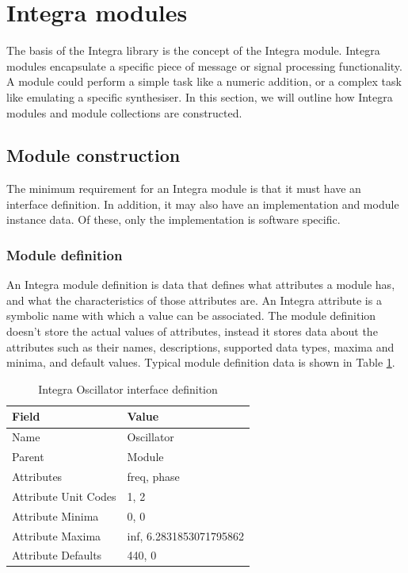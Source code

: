 \section{Integra modules}\label{sec:modules}

The basis of the Integra library is the concept of the Integra module.
Integra modules encapsulate a specific piece of message or signal
processing functionality. A module could perform a simple task like a
numeric addition, or a complex task like emulating a specific
synthesiser. In this section, we will outline how Integra modules and
module collections are constructed.

\subsection{Module construction}\label{subsec:module_construction}

The minimum requirement for an Integra module is that it must have an
interface definition. In addition, it may also have an implementation
and module instance data. Of these, only the implementation is
software specific.

\subsubsection{Module definition}\label{subsubsec:module_definition}

An Integra module definition is data that defines what attributes a
module has, and what the characteristics of those attributes are. An
Integra attribute is a symbolic name with which a value can be
associated. The module definition doesn't store the actual values of
attributes, instead it stores data about the attributes such as their
names, descriptions, supported data types, maxima and minima, and
default values. Typical module definition data is shown in Table
\ref{tab:module_definition}.

\begin{table}
\begin{center}
\begin{tabular}{|l|l|}
\hline
\textbf{Field} & \textbf{Value} \\
\hline
Name  & Oscillator \\
\hline
Parent  & Module \\
\hline
Attributes & freq, phase \\
\hline
Attribute Unit Codes & 1, 2 \\
\hline
Attribute Minima & 0, 0 \\
\hline
Attribute Maxima & inf, 6.2831853071795862 \\
\hline
Attribute Defaults & 440, 0 \\
\hline
\end{tabular} 
\end{center}
\caption{Integra Oscillator interface definition}
\label{tab:module_definition}
\end{table}

